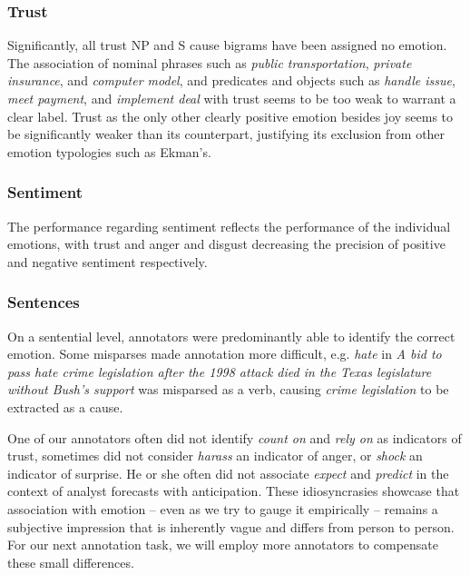 \subsubsection{Trust}

Significantly, all trust NP and S cause bigrams have been assigned no emotion. The association of nominal phrases such as \textit{public transportation}, \textit{private insurance}, and \textit{computer model}, and predicates and objects such as \textit{handle issue}, \textit{meet payment}, and \textit{implement deal} with trust seems to be too weak to warrant a clear label. Trust as the only other clearly positive emotion besides joy seems to be significantly weaker than its counterpart, justifying its exclusion from other emotion typologies such as Ekman's.

\subsubsection{Sentiment}

The performance regarding sentiment reflects the performance of the individual emotions, with trust and anger and disgust decreasing the precision of positive and negative sentiment respectively.

\subsubsection{Sentences}

On a sentential level, annotators were predominantly able to identify the correct emotion. Some misparses made annotation more difficult, e.g. \textit{hate} in \textit{A bid to pass hate crime legislation after the 1998 attack died in the Texas legislature without Bush's support} was misparsed as a verb, causing \textit{crime legislation} to be extracted as a cause.

One of our annotators often did not identify \textit{count on} and \textit{rely on} as indicators of trust, sometimes did not consider \textit{harass} an indicator of anger, or \textit{shock} an indicator of surprise. He or she often did not associate \textit{expect} and \textit{predict} in the context of analyst forecasts with anticipation. These idiosyncrasies showcase that association with emotion -- even as we try to gauge it empirically -- remains a subjective impression that is inherently vague and differs from person to person. For our next annotation task, we will employ more annotators to compensate these small differences.

